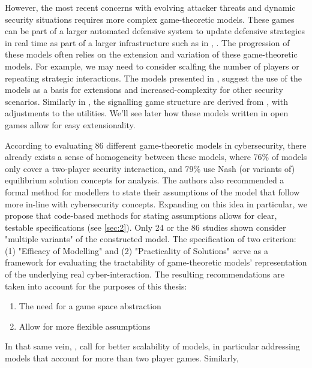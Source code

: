 However, the most recent concerns with evolving attacker threats and dynamic security situations requires more complex game-theoretic models. These games can be part of a larger automated defensive system to update defensive strategies in real time as part of a larger infrastructure such as in \cite{Jin2018}, \cite{Zhu2012}. The progression of these models often relies on the extension and variation of these game-theoretic models. For example, we may need to consider scalfing the number of players or repeating strategic interactions. The models presented in \cite{Chen2009}, \cite{Nochenson2012} suggest the use of the models as a basis for extensions and increased-complexity for other security scenarios. Similarly in \cite{Pawlick2015}, the signalling game structure are derived from \cite{Carroll2009}, with adjustments to the utilities. We'll see later how these models written in open games allow for easy extensionality.

According to \cite{Collins2025} evaluating 86 different game-theoretic models in cybersecurity, there already exists a sense of homogeneity between these models, where 76\% of models only cover a two-player security interaction, and 79\% use Nash (or variants of) equilibrium solution concepts for analysis. The authors also recommended a formal method for modellers to state their assumptions of the model that follow more in-line with cybersecurity concepts. Expanding on this idea in particular, we propose that code-based methods for stating assumptions allows for clear, testable specifications (see \ref{sec:2}). Only 24 or the 86 studies shown consider "multiple variants" of the constructed model. The specification of two criterion: (1) "Efficacy of Modelling" and (2) "Practicality of Solutions" serve as a framework for evaluating the tractability of game-theoretic models' representation of the underlying real cyber-interaction. The resulting recommendations are taken into account for the purposes of this thesis: 
\begin{enumerate}
	\item The need for a game space abstraction 
	\item Allow for more flexible assumptions
\end{enumerate}

In that same vein, \cite{Egan2025}, \cite{Liang2013} call for better scalability of models, in particular addressing models that account for more than two player games. Similarly, \cite{lye2005game} 
%

